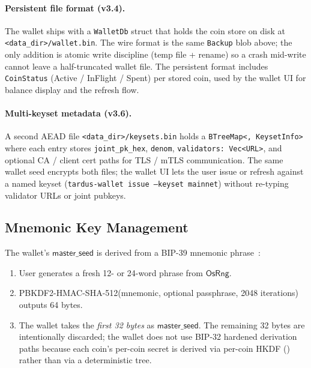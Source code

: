 \paragraph{Persistent file format (v3.4).} The wallet ships with a
\texttt{WalletDb} struct that holds the coin store on disk at
\texttt{<data\_dir>/wallet.bin}. The wire format is the same
\texttt{Backup} blob above; the only addition is atomic write
discipline (temp file + rename) so a crash mid-write cannot leave a
half-truncated wallet file. The persistent format includes
\texttt{CoinStatus} (Active / InFlight / Spent) per stored coin, used
by the wallet UI for balance display and the refresh flow.

\paragraph{Multi-keyset metadata (v3.6).} A second AEAD file
\texttt{<data\_dir>/keysets.bin} holds a
\texttt{BTreeMap<, KeysetInfo>} where each entry stores
\texttt{joint\_pk\_hex}, \texttt{denom},
\texttt{validators: Vec<URL>}, and optional CA / client cert paths
for TLS / mTLS communication. The same wallet seed encrypts both
files; the wallet UI lets the user issue or refresh against a named
keyset (\texttt{tardus-wallet issue --keyset mainnet}) without
re-typing validator URLs or joint pubkeys.

\subsection{Mnemonic Key Management}
\label{sec:wallet-mnemonic}

The wallet's $\mathsf{master\_seed}$ is derived from a BIP-39
mnemonic phrase~\cite{bip39}:

\begin{enumerate}[leftmargin=2em,itemsep=0pt]
  \item User generates a fresh 12- or 24-word phrase from
        $\mathsf{OsRng}$.
  \item PBKDF2-HMAC-SHA-512(mnemonic, optional passphrase, 2048 iterations)
        outputs 64 bytes.
  \item The wallet takes the \emph{first 32 bytes} as
        $\mathsf{master\_seed}$. The remaining 32 bytes are intentionally
        discarded; the wallet does not use BIP-32 hardened derivation
        paths because each coin's per-coin secret is derived via
        per-coin HKDF () rather than via
        a deterministic tree.
\end{enumerate}


